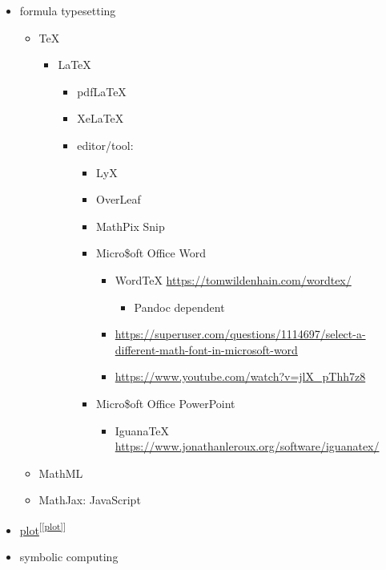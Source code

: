 \documentclass[
]{book}
\providecommand{\tightlist}{%
  \setlength{\itemsep}{0pt}\setlength{\parskip}{0pt}}
\theoremstyle{definition}
\theoremstyle{definition}
\theoremstyle{definition}
\theoremstyle{definition}
\theoremstyle{remark}
\begin{document}
\begin{itemize}
\tightlist
\item
  formula typesetting

  \begin{itemize}
  \tightlist
  \item
    TeX

    \begin{itemize}
    \tightlist
    \item
      LaTeX

      \begin{itemize}
      \tightlist
      \item
        pdfLaTeX
      \item
        XeLaTeX
      \item
        editor/tool:

        \begin{itemize}
        \tightlist
        \item
          LyX
        \item
          OverLeaf
        \item
          MathPix Snip
        \item
          Micro\$oft Office Word

          \begin{itemize}
          \tightlist
          \item
            WordTeX \url{https://tomwildenhain.com/wordtex/}

            \begin{itemize}
            \tightlist
            \item
              Pandoc dependent
            \end{itemize}
          \item
            \url{https://superuser.com/questions/1114697/select-a-different-math-font-in-microsoft-word}
          \item
            \url{https://www.youtube.com/watch?v=jlX_pThh7z8}
          \end{itemize}
        \item
          Micro\$oft Office PowerPoint

          \begin{itemize}
          \tightlist
          \item
            IguanaTeX \url{https://www.jonathanleroux.org/software/iguanatex/}
          \end{itemize}
        \end{itemize}
      \end{itemize}
    \end{itemize}
  \item
    MathML
  \item
    MathJax: JavaScript
  \end{itemize}
\item
  \protect\hyperlink{plot}{plot}\textsuperscript{{[}\ref{plot}{]}}
\item
  symbolic computing


\end{itemize}
\end{document}
